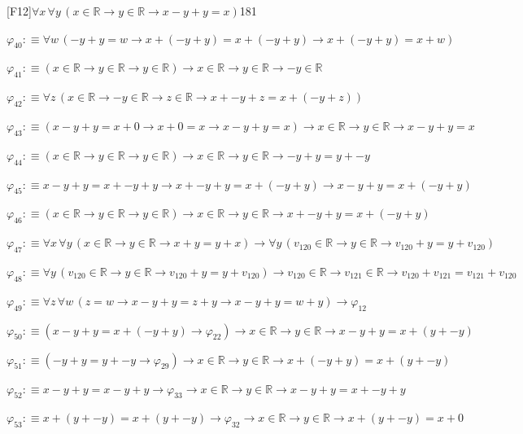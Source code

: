 \begin{fullproof}{[F12]}{$\forall x\,\forall y\,(x \in \mathbb{R} \to y \in \mathbb{R} \to x - y + y = x)$}{181}
\begin{abbrevlist}
\item $\varphi_{40} :\equiv \forall w\,(-y + y = w \to x + (-y + y) = x + (-y + y) \to x + (-y + y) = x + w)$
\item $\varphi_{41} :\equiv (x \in \mathbb{R} \to y \in \mathbb{R} \to y \in \mathbb{R}) \to x \in \mathbb{R} \to y \in \mathbb{R} \to -y \in \mathbb{R}$
\item $\varphi_{42} :\equiv \forall z\,(x \in \mathbb{R} \to -y \in \mathbb{R} \to z \in \mathbb{R} \to x + -y + z = x + (-y + z))$
\item $\varphi_{43} :\equiv (x - y + y = x + 0 \to x + 0 = x \to x - y + y = x) \to x \in \mathbb{R} \to y \in \mathbb{R} \to x - y + y = x$
\item $\varphi_{44} :\equiv (x \in \mathbb{R} \to y \in \mathbb{R} \to y \in \mathbb{R}) \to x \in \mathbb{R} \to y \in \mathbb{R} \to -y + y = y + -y$
\item $\varphi_{45} :\equiv x - y + y = x + -y + y \to x + -y + y = x + (-y + y) \to x - y + y = x + (-y + y)$
\item $\varphi_{46} :\equiv (x \in \mathbb{R} \to y \in \mathbb{R} \to y \in \mathbb{R}) \to x \in \mathbb{R} \to y \in \mathbb{R} \to x + -y + y = x + (-y + y)$
\item $\varphi_{47} :\equiv \forall x\,\forall y\,(x \in \mathbb{R} \to y \in \mathbb{R} \to x + y = y + x) \to \forall y\,(v_{120} \in \mathbb{R} \to y \in \mathbb{R} \to v_{120} + y = y + v_{120})$
\item $\varphi_{48} :\equiv \forall y\,(v_{120} \in \mathbb{R} \to y \in \mathbb{R} \to v_{120} + y = y + v_{120}) \to v_{120} \in \mathbb{R} \to v_{121} \in \mathbb{R} \to v_{120} + v_{121} = v_{121} + v_{120}$
\item $\varphi_{49} :\equiv \forall z\,\forall w\,(z = w \to x - y + y = z + y \to x - y + y = w + y) \to \varphi_{12}$
\item $\varphi_{50} :\equiv (x - y + y = x + (-y + y) \to \varphi_{22}) \to x \in \mathbb{R} \to y \in \mathbb{R} \to x - y + y = x + (y + -y)$
\item $\varphi_{51} :\equiv (-y + y = y + -y \to \varphi_{29}) \to x \in \mathbb{R} \to y \in \mathbb{R} \to x + (-y + y) = x + (y + -y)$
\item $\varphi_{52} :\equiv x - y + y = x - y + y \to \varphi_{33} \to x \in \mathbb{R} \to y \in \mathbb{R} \to x - y + y = x + -y + y$
\item $\varphi_{53} :\equiv x + (y + -y) = x + (y + -y) \to \varphi_{32} \to x \in \mathbb{R} \to y \in \mathbb{R} \to x + (y + -y) = x + 0$

\end{abbrevlist}
\end{fullproof}
